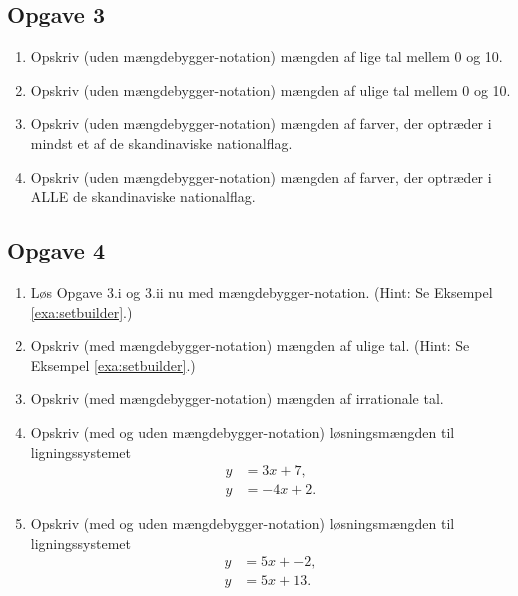 \subsection*{Opgave 3}
\begin{enumerate}[label=\roman*)]
 \item Opskriv (uden mængdebygger-notation) mængden af lige tal mellem 0 og 10.
 \item Opskriv (uden mængdebygger-notation) mængden af ulige tal mellem 0 og 10.
 \item Opskriv (uden mængdebygger-notation) mængden af farver, der optræder i mindst et af de skandinaviske nationalflag.
 \item Opskriv (uden mængdebygger-notation) mængden af farver, der optræder i ALLE de skandinaviske nationalflag.
\end{enumerate}
\subsection*{Opgave 4}
\begin{enumerate}[label = \roman*)]
\item Løs Opgave 3.i og 3.ii nu med mængdebygger-notation. (Hint: Se Eksempel \ref{exa:setbuilder}.)
\item Opskriv (med mængdebygger-notation) mængden af ulige tal. (Hint: Se Eksempel \ref{exa:setbuilder}.)
\item Opskriv (med mængdebygger-notation) mængden af irrationale tal.
\item Opskriv (med og uden mængdebygger-notation) løsningsmængden til ligningssystemet 
\begin{align*}
y &= 3x+7,\\
y &= -4x+2.
\end{align*}
\item Opskriv (med og uden mængdebygger-notation) løsningsmængden til ligningssystemet 
\begin{align*}
y &= 5x+-2,\\
y &= 5x+13.
\end{align*}

\end{enumerate}